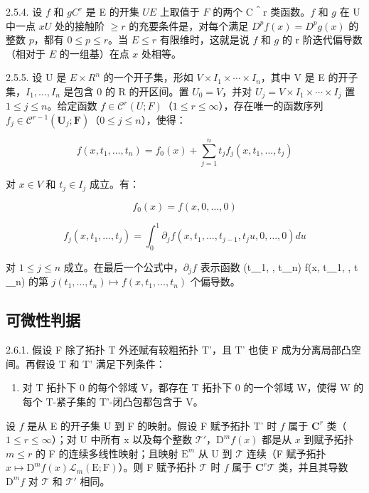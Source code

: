 2.5.4. 设 \(f\) 和 \(g\)\(C^r\) 是 E 的开集 \(U\)\(E\) 上取值于 \(F\) 的两个 C＾r 类函数。\(f\) 和 \(g\) 在 U 中一点 \(x\)\(U\) 处的接触阶 \(\geqslant r\) 的充要条件是，对每个满足 \(D^p f(x) = D^p g(x)\) 的整数 \(p\)，都有 \(0 \leqslant p \leqslant r\)。当 \(E\)\(\leqslant r\) 有限维时，这就是说 \(f\) 和 \(g\) 的  r 阶迭代偏导数（相对于 \(E\) 的一组基）在点 \(x\) 处相等。

2.5.5. 设 U 是 \(E \times R^{n}\) 的一个开子集，形如 \(V \times I_{1} \times \cdots \times I_{n}\)，其中 V 是 E 的开子集，\(I_{1}, \ldots, I_{n}\) 是包含 0 的 R 的开区间。置 \(U_{0} = V\)，并对 \(U_{j} = V \times I_{1} \times \cdots \times I_{j}\) 置 \(1 \leqslant j \leqslant n\)。给定函数 \(f \in \mathcal{C}^{r}(U; F)\)（\(1 \leqslant r \leqslant \infty\)），存在唯一的函数序列 \(f_{j}\in\mathcal{C}^{r-1}(\mathbf{U}_{j};\mathbf{F})\)（\(0\leqslant j\leqslant n\)），使得：

\[
f (x, t _ {1}, \dots , t _ {n}) = f _ {0} (x) + \sum_ {j = 1} ^ {n} t _ {j} f _ {j} (x, t _ {1}, \dots , t _ {j})
\]

对 \(x \in V\) 和 \(t_j \in I_j\) 成立。有：

\[
f _ {0} (x) = f (x, 0, \dots , 0)
\]

\[
f _ {j} (x, t _ {1}, \dots , t _ {j}) = \int_ {0} ^ {1} \partial_ {j} f (x, t _ {1}, \dots , t _ {j - 1}, t _ {j} u, 0, \dots , 0) d u
\]

对 \(1 \leqslant j \leqslant n\) 成立。在最后一个公式中，\(\partial_j f\) 表示函数 (t＿1, , t＿n)  f(x, t＿1, , t＿n) 的第 \(j\)\((t_1, \ldots, t_n) \mapsto f(x, t_1, \ldots, t_n)\) 个偏导数。

\subsection{可微性判据}

2.6.1. 假设 F 除了拓扑 T 外还赋有较粗拓扑 T'，且 T' 也使 F 成为分离局部凸空间。再假设 T 和 T' 满足下列条件：

\begin{enumerate}
\def\labelenumi{(\Alph{enumi})}
\setcounter{enumi}{18}
\tightlist
\item
  对 T 拓扑下 0 的每个邻域 V，都存在 T 拓扑下 0 的一个邻域 W，使得 W 的每个 T-紧子集的 T'-闭凸包都包含于 V。
\end{enumerate}

设 \(f\) 是从 E 的开子集 U 到 F 的映射。假设 F 赋予拓扑 T' 时 \(f\) 属于 \(\mathbf{C}^{r}\) 类（\(1 \leqslant r \leqslant \infty\)）；对 U 中所有 x 以及每个整数 \(\mathcal{T}'\)，\(\mathrm{D}^{m}f(x)\) 都是从 \(x\) 到赋予拓扑 \(m \leqslant r\) 的 F 的连续多线性映射；且映射 \(\mathrm{E}^{m}\) 从 U 到 \(\mathcal{T}\) 连续（F 赋予拓扑 \(x \mapsto \mathrm{D}^{m}f(x)\)\(\mathcal{L}_{m}(\mathrm{E};\mathrm{F})\)）。则 F 赋予拓扑 \(\mathcal{T}\) 时 \(f\) 属于 \(\mathbf{C}^{r}\)\(\mathcal{T}\) 类，并且其导数 \(\mathrm{D}^{m}f\) 对 \(\mathcal{T}\) 和 \(\mathcal{T}'\) 相同。

